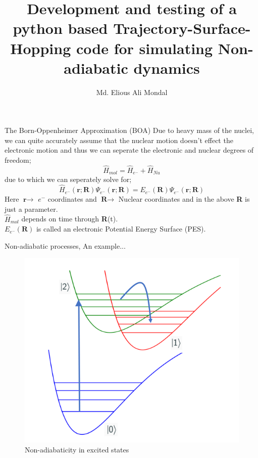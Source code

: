 \documentclass{beamer}
\title{Development and testing of a python based Trajectory-Surface-Hopping code for simulating Non-adiabatic dynamics}
\author{Md. Elious Ali Mondal}
\date{}
\begin{document}

	\begin{frame}
	\titlepage
	\end{frame}
	
	\begin{frame}[t]{The Born-Oppenheimer Approximation (BOA)}
	Due to heavy mass of the nuclei, we can quite accurately assume that the nuclear motion doesn't effect the electronic motion and thus we can seperate the electronic and nuclear degrees of freedom;
	\begin{equation}
	\hat{H}_{mol} = \hat{H}_{e^-} + \hat{H}_{Nu}
	\end{equation}
	due to which we can seperately solve for;
	\begin{equation}
	\hat{H}_{e^-}(\textbf{r};\textbf{R})\Psi_{e^-}(\textbf{r};\textbf{R}) = E_{e^-}(\textbf{R})\Psi_{e^-}(\textbf{r};\textbf{R})
	\end{equation}
	Here $\textbf{r}\rightarrow$ $e^-$ coordinates and $\textbf{R}\rightarrow$ Nuclear coordinates and in the above \textbf{R} is just a parameter.\\ $\hat{H}_{mol}$ depends on time through \textbf{R}(t).\\ $E_{e^-}(\textbf{R})$ is called an electronic Potential Energy Surface (PES).
	\end{frame}	
	
	\begin{frame}[t]{Non-adiabatic processes, An example...}
	\begin{figure}
	\includegraphics[scale=0.50]{NAD.png}
	\caption{Non-adiabaticity in excited states}
	\end{figure}
	\end{frame}
	
\end{document}
